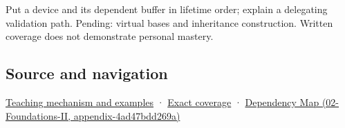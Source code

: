Put a device and its dependent buffer in lifetime order; explain a delegating validation path. Pending: virtual bases and inheritance construction. Written coverage does not demonstrate personal mastery.

\subsection{Source and navigation}\label{appendix-3cb49709605a-source-and-navigation}

\hyperref[01-foundations-i-ch003-construction-order-records-lifetime-dependencies]{Teaching mechanism and examples} · \hyperref[appendix-fd090d982a15-m009---parts-127-147]{Exact coverage} · \href{../02-Foundations-II/main.pdf\#nameddest=appendix-4ad47bdd269a}{Dependency Map (02-Foundations-II, appendix-4ad47bdd269a)}
